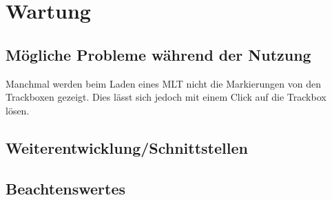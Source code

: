 \chapter{Wartung}

\section{Mögliche Probleme während der Nutzung}
Manchmal werden beim Laden eines MLT nicht die Markierungen von den Trackboxen gezeigt. Dies lässt sich jedoch mit einem Click auf die Trackbox lösen. 
\section{Weiterentwicklung/Schnittstellen}

\section{Beachtenswertes}
